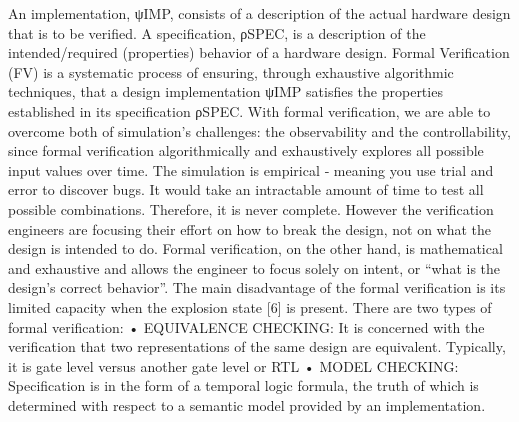 \documentclass{article}
\begin{document}
		An implementation, ψIMP, consists of a description
		of the actual hardware design that is to be
		verified. A specification, ρSPEC, is a description of
		the intended/required (properties) behavior of a
		hardware design. Formal Verification (FV) is a
		systematic process of ensuring, through
		exhaustive algorithmic techniques, that a design
		implementation ψIMP satisfies the properties
		established in its specification ρSPEC. With formal
		verification, we are able to overcome both of
		simulation’s challenges: the observability and the
		controllability, since formal verification
		algorithmically and exhaustively explores all
		possible input values over time. The simulation is
		empirical ‐ meaning you use trial and error to
		discover bugs. It would take an intractable
		amount of time to test all possible combinations.
		Therefore, it is never complete. However the
		verification engineers are focusing their effort on
		how to break the design, not on what the design is
		intended to do. Formal verification, on the other
		hand, is mathematical and exhaustive and allows
		the engineer to focus solely on intent, or “what is
		the design’s correct behavior”. The main
		disadvantage of the formal verification is its
		limited capacity when the explosion state [6] is
		present.
		There are two types of formal verification:
		• EQUIVALENCE CHECKING: It is concerned
		with the verification that two
		representations of the same design are
		equivalent. Typically, it is gate level versus
		another gate level or RTL
		• MODEL CHECKING: Specification is in the
		form of a temporal logic formula, the
		truth of which is determined with respect
		to a semantic model provided by an
		implementation.
		
\end{document}
